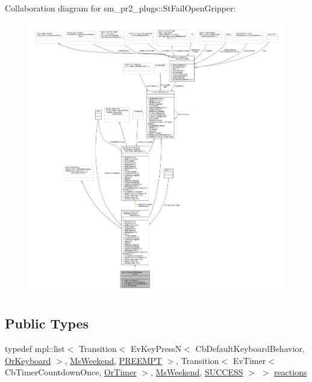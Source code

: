 Collaboration diagram for sm\+\_\+pr2\+\_\+plugs\+:\+:St\+Fail\+Open\+Gripper\+:
\nopagebreak
\begin{figure}[H]
\begin{center}
\leavevmode
\includegraphics[width=350pt]{structsm__pr2__plugs_1_1StFailOpenGripper__coll__graph}
\end{center}
\end{figure}
\subsection*{Public Types}
\begin{DoxyCompactItemize}
\item 
typedef mpl\+::list$<$ Transition$<$ Ev\+Key\+PressN$<$ Cb\+Default\+Keyboard\+Behavior, \hyperlink{classsm__pr2__plugs_1_1OrKeyboard}{Or\+Keyboard} $>$, \hyperlink{classsm__pr2__plugs_1_1MsWeekend}{Ms\+Weekend}, \hyperlink{classPREEMPT}{P\+R\+E\+E\+M\+PT} $>$, Transition$<$ Ev\+Timer$<$ Cb\+Timer\+Countdown\+Once, \hyperlink{classsm__pr2__plugs_1_1OrTimer}{Or\+Timer} $>$, \hyperlink{classsm__pr2__plugs_1_1MsWeekend}{Ms\+Weekend}, \hyperlink{classSUCCESS}{S\+U\+C\+C\+E\+SS} $>$ $>$ \hyperlink{structsm__pr2__plugs_1_1StFailOpenGripper_a9779d3f7c0bb4155fdab72e2cb0efe0d}{reactions}
\end{DoxyCompactItemize}
